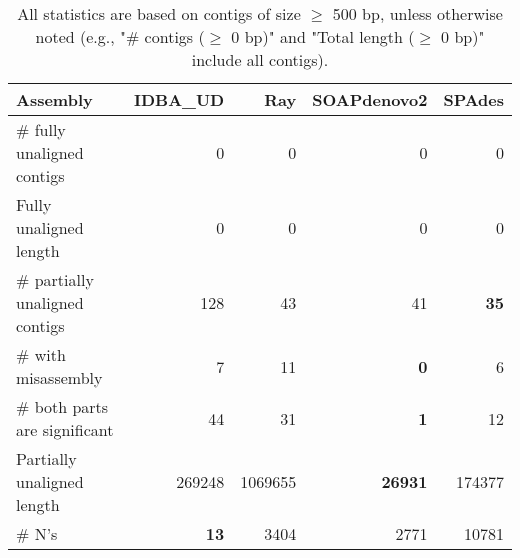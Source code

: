 \documentclass[12pt,a4paper]{article}
\begin{document}
\begin{table}[ht]
\begin{center}
\caption{All statistics are based on contigs of size $\geq$ 500 bp, unless otherwise noted (e.g., "\# contigs ($\geq$ 0 bp)" and "Total length ($\geq$ 0 bp)" include all contigs).}
\begin{tabular}{|l*{4}{|r}|}
\hline
Assembly & IDBA\_UD & Ray & SOAPdenovo2 & SPAdes \\ \hline
\# fully unaligned contigs & 0 & 0 & 0 & 0 \\ \hline
Fully unaligned length & 0 & 0 & 0 & 0 \\ \hline
\# partially unaligned contigs & 128 & 43 & 41 & {\bf 35} \\ \hline
\hspace{5mm}\# with misassembly & 7 & 11 & {\bf 0} & 6 \\ \hline
\hspace{5mm}\# both parts are significant & 44 & 31 & {\bf 1} & 12 \\ \hline
Partially unaligned length & 269248 & 1069655 & {\bf 26931} & 174377 \\ \hline
\# N's & {\bf 13} & 3404 & 2771 & 10781 \\ \hline
\end{tabular}
\end{center}
\end{table}
\end{document}
